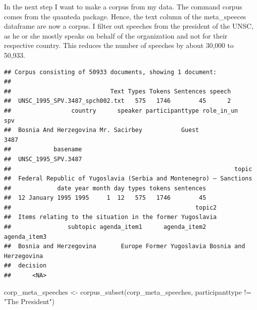 \documentclass[
]{article}
\newenvironment{Shaded}{\begin{snugshade}}{\end{snugshade}}
\newcommand{\AttributeTok}[1]{\textcolor[rgb]{0.77,0.63,0.00}{#1}}
\newcommand{\CommentTok}[1]{\textcolor[rgb]{0.56,0.35,0.01}{\textit{#1}}}
\newcommand{\DecValTok}[1]{\textcolor[rgb]{0.00,0.00,0.81}{#1}}
\newcommand{\FunctionTok}[1]{\textcolor[rgb]{0.00,0.00,0.00}{#1}}
\newcommand{\NormalTok}[1]{#1}
\newcommand{\OtherTok}[1]{\textcolor[rgb]{0.56,0.35,0.01}{#1}}
\newcommand{\SpecialCharTok}[1]{\textcolor[rgb]{0.00,0.00,0.00}{#1}}
\newcommand{\StringTok}[1]{\textcolor[rgb]{0.31,0.60,0.02}{#1}}
\begin{document}
In the next step I want to make a corpus from my data. The command
corpus comes from the quanteda package. Hence, the text column of the
meta\_speeces dataframe are now a corpus. I ﬁlter out speeches from the
president of the UNSC, as he or she mostly speaks on behalf of the
organization and not for their respective country. This reduces the
number of speeches by about 30,000 to 50,933.

\begin{Shaded}
\end{Shaded}

\begin{verbatim}
## Corpus consisting of 50933 documents, showing 1 document:
## 
##                            Text Types Tokens Sentences speech
##  UNSC_1995_SPV.3487_spch002.txt   575   1746        45      2
##                 country      speaker participanttype role_in_un  spv
##  Bosnia And Herzegovina Mr. Sacirbey           Guest            3487
##            basename
##  UNSC_1995_SPV.3487
##                                                               topic
##  Federal Republic of Yugoslavia (Serbia and Montenegro) — Sanctions
##             date year month day types tokens sentences
##  12 January 1995 1995     1  12   575   1746        45
##                                                    topic2
##  Items relating to the situation in the former Yugoslavia
##                subtopic agenda_item1      agenda_item2           agenda_item3
##  Bosnia and Herzegovina       Europe Former Yugoslavia Bosnia and Herzegovina
##  decision
##      <NA>
\end{verbatim}

\begin{Shaded}
\begin{Highlighting}[]
\NormalTok{corp\_meta\_speeches }\OtherTok{\textless{}{-}} \FunctionTok{corpus\_subset}\NormalTok{(corp\_meta\_speeches, participanttype }\SpecialCharTok{!=} \StringTok{"The President"}\NormalTok{)}
\end{Highlighting}
\end{Shaded}
\end{document}
